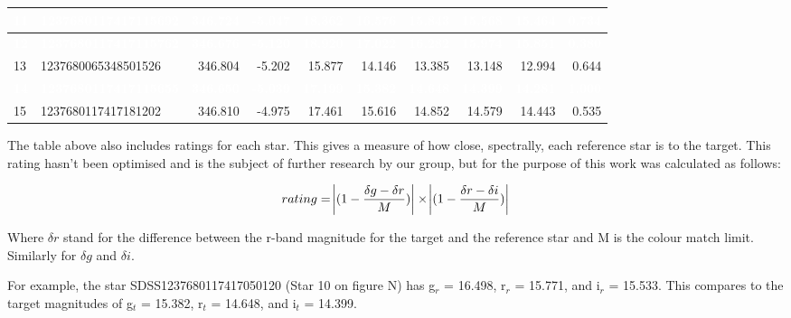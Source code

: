 \documentclass[]{elsarticle} %
\begin{document}
\begin{table}[H]
\begin{tabular}{l|l|r|r|r|r|r|r|r|r}
\hline
\rowcolor[HTML]{D7261E}  \textcolor{white}{\textbf{11}} & \textcolor{white}{\textbf{1237680117417115692}} & \textcolor{white}{\textbf{346.724}} & \textcolor{white}{\textbf{-5.047}} & \textcolor{white}{\textbf{18.362}} & \textcolor{white}{\textbf{16.576}} & \textcolor{white}{\textbf{15.843}} & \textcolor{white}{\textbf{15.568}} & \textcolor{white}{\textbf{15.464}} & \textcolor{white}{\textbf{0.734}}\\
\hline
\rowcolor[HTML]{D7261E}  \textcolor{white}{\textbf{12}} & \textcolor{white}{\textbf{1237680117417115762}} & \textcolor{white}{\textbf{346.676}} & \textcolor{white}{\textbf{-5.120}} & \textcolor{white}{\textbf{18.920}} & \textcolor{white}{\textbf{17.022}} & \textcolor{white}{\textbf{16.282}} & \textcolor{white}{\textbf{15.974}} & \textcolor{white}{\textbf{15.851}} & \textcolor{white}{\textbf{0.380}}\\
\hline
13 & 1237680065348501526 & 346.804 & -5.202 & 15.877 & 14.146 & 13.385 & 13.148 & 12.994 & 0.644\\
\hline
\rowcolor[HTML]{D7261E}  \textcolor{white}{\textbf{14}} & \textcolor{white}{\textbf{1237680117417115655}} & \textcolor{white}{\textbf{346.650}} & \textcolor{white}{\textbf{-5.039}} & \textcolor{white}{\textbf{17.199}} & \textcolor{white}{\textbf{15.382}} & \textcolor{white}{\textbf{14.648}} & \textcolor{white}{\textbf{14.399}} & \textcolor{white}{\textbf{14.281}} & \textcolor{white}{\textbf{1.000}}\\
\hline
15 & 1237680117417181202 & 346.810 & -4.975 & 17.461 & 15.616 & 14.852 & 14.579 & 14.443 & 0.535\\
\hline
\end{tabular}
\end{table}

The table above also includes ratings for each star. This gives a
measure of how close, spectrally, each reference star is to the target.
This rating hasn't been optimised and is the subject of further research
by our group, but for the purpose of this work was calculated as
follows:

\[rating = \abs{(1-\frac{\delta g - \delta r}{M})} \times \abs{(1-\frac{\delta r - \delta i}{M})}\]

Where \(\delta r\) stand for the difference between the r-band magnitude
for the target and the reference star and M is the colour match limit.
Similarly for \(\delta g\) and \(\delta i\).

For example, the star SDSS1237680117417050120 (Star 10 on figure N) has
g\(_r\) = 16.498, r\(_r\) = 15.771, and i\(_r\) = 15.533. This compares
to the target magnitudes of g\(_t\) = 15.382, r\(_t\) = 14.648, and
i\(_t\) = 14.399.
\end{document}
